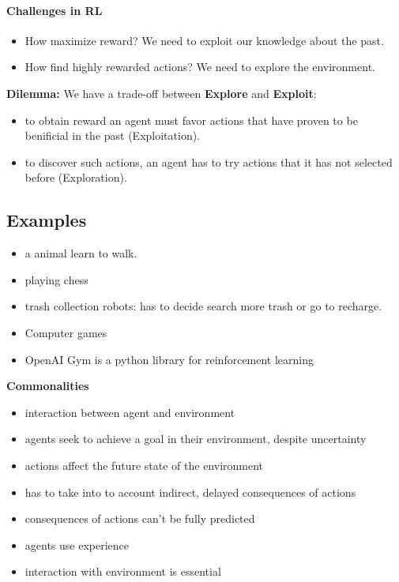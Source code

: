 \documentclass[10pt,a4paper]{article}
\begin{document}
\paragraph{Challenges in RL}
\begin{itemize}
\item How maximize reward? We need to exploit our knowledge about the past.
\item How find highly rewarded actions? We need to explore the environment.
\end{itemize}
\textbf{Dilemma:} We have a trade-off between \textbf{Explore} and \textbf{Exploit}:
\begin{itemize}
\item to obtain reward an agent must favor actions that have proven to be benificial in the past (Exploitation).
\item to discover such actions, an agent has to try actions that it has not selected before (Exploration).
\end{itemize}


\subsection{Examples}
\begin{itemize}
\item a animal learn to walk.
\item playing chess
\item trash collection robots: has to decide search more trash or go to recharge.
\item Computer games
\item OpenAI Gym is a python library for reinforcement learning
\end{itemize}
\textbf{Commonalities}
\begin{itemize}
\item interaction between agent and environment
\item agents seek to achieve a goal in their environment, despite uncertainty
\item actions affect the future state of the environment
\item has to take into to account indirect, delayed consequences of actions
\item consequences of actions can't be fully predicted
\item agents use experience
\item interaction with environment is essential
\end{itemize}
\end{document}
